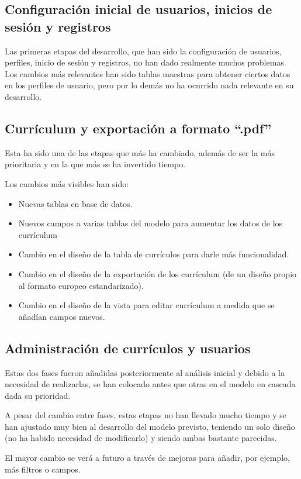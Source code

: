 \subsection{Configuración inicial de usuarios, inicios de sesión y registros}
Las primeras etapas del desarrollo, que han sido la configuración de usuarios, perfiles, inicio de sesión y registros, no han dado realmente muchos problemas. Los cambios más relevantes han sido tablas maestras para obtener ciertos datos en los perfiles de usuario, pero por lo demás no ha ocurrido nada relevante en su desarrollo.

\subsection{Currículum y exportación a formato ``.pdf''}
Esta ha sido una de las etapas que más ha cambiado, además de ser la más prioritaria y en la que más se ha invertido tiempo. 

Los cambios más visibles han sido:
\begin{itemize}
 \item Nuevas tablas en base de datos.
 \item Nuevos campos a varias tablas del modelo para aumentar los datos de los currículum
 \item Cambio en el diseño de la tabla de currículos para darle más funcionalidad.
 \item Cambio en el diseño de la exportación de los currículum (de un diseño propio al formato europeo estandarizado).
 \item Cambio en el diseño de la vista para editar currículum a medida que se añadían campos nuevos.
\end{itemize}

\subsection{Administración de currículos y usuarios}
Estas dos fases fueron añadidas posteriormente al análisis inicial y debido a la necesidad de realizarlas, se han colocado antes que otras en el modelo en cascada dada su prioridad.

A pesar del cambio entre fases, estas etapas no han llevado mucho tiempo y se han ajustado muy bien al desarrollo del modelo previsto, teniendo un solo diseño (no ha habido necesidad de modificarlo) y siendo ambas bastante parecidas.

El mayor cambio se verá a futuro a través de mejoras para añadir, por ejemplo, más filtros o campos.

